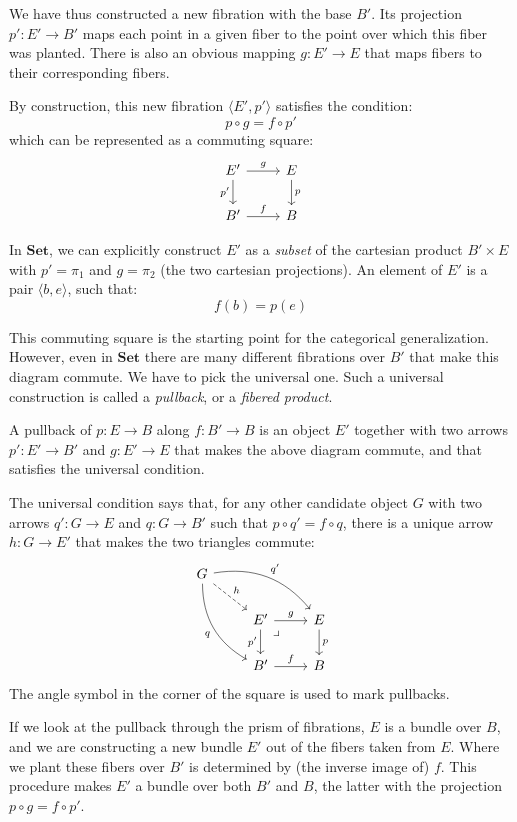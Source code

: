 \documentclass[DaoFP]{subfiles}
\begin{document}
We have thus constructed a new fibration with the base $B'$. Its projection $p' \colon E' \to B'$ maps each point in a given fiber to the point over which this fiber was planted. There is also an obvious mapping $g \colon E' \to E$ that maps fibers to their corresponding fibers. 

By construction, this new fibration $\langle E', p'\rangle$ satisfies the condition:
\[ p \circ g = f \circ p' \]
which can be represented as a commuting square:
\[
 \begin{tikzcd}
 E'
 \arrow[d, "p'"']
 \arrow[r, "g"]
 & E
 \arrow[d, "p"]
 \\
 B'
 \arrow[r, "f"]
 &B
  \end{tikzcd}
\]

In  $\mathbf{Set}$, we can explicitly construct $E'$ as a \emph{subset} of the cartesian product $B' \times E$ with $p' = \pi_1$ and $g = \pi_2$ (the two cartesian projections). An element of $E'$ is a pair $\langle b, e \rangle$, such that:
\[ f (b) = p (e) \]

This commuting square is the starting point for the categorical generalization. However, even in $\mathbf{Set}$ there are many different fibrations over $B'$ that make this diagram commute. We have to pick the universal one. Such a universal construction is called a \emph{pullback}, or a \emph{fibered product}.

A pullback of $p \colon E \to B$ along $f \colon B' \to B$ is an object $E'$ together with two arrows $p' \colon E' \to B'$ and $g \colon E' \to E$ that makes the above diagram commute, and that satisfies the universal condition. 

The universal condition says that, for any other candidate object $G$ with two arrows $q' \colon G \to E$ and $q \colon G \to B'$ such that $p \circ q' = f \circ q$, there is a unique arrow $h \colon G \to E'$ that makes the two triangles commute:
\[
 \begin{tikzcd}
 G
 \arrow[dr, dashed, "h"]
 \arrow[drr, bend left, "q'"]
 \arrow[ddr, bend right, "q"']
 \\
 &E'
 \arrow[r, "g"]
 \arrow[d, "p'"']
\arrow[dr, phantom,  , very near start, "\lrcorner"]
 &E
 \arrow[d, "p"]
 \\
 &B'
 \arrow[r, "f"]
 &B
  \end{tikzcd}
\]
The angle symbol in the corner of the square is used to mark pullbacks.

If we look at the pullback through the prism of fibrations, $E$ is a bundle over $B$, and we are constructing a new bundle $E'$ out of the fibers taken from $E$. Where we plant these fibers over $B'$ is determined by (the inverse image of) $f$. This procedure makes $E'$ a bundle over both $B'$ and $B$, the latter with the projection $p \circ g = f \circ p'$. 
\end{document}
